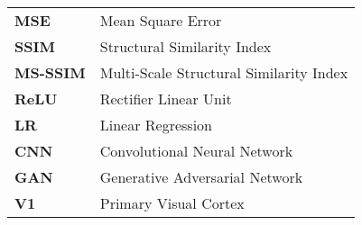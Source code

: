 \documentclass[12pt,a4paper]{report}
\let\openright=\clearpage
\begin{document}



\tableofcontents


%








\listoffigures



\begin{tabular}{ll}

\textbf{MSE} & Mean Square Error \\

\textbf{SSIM} & Structural Similarity Index \\

\textbf{MS-SSIM} & Multi-Scale Structural Similarity Index \\

\textbf{ReLU} & Rectifier Linear Unit \\

\textbf{LR} & Linear Regression \\

\textbf{CNN} & Convolutional Neural Network \\

\textbf{GAN} & Generative Adversarial Network \\

\textbf{V1} & Primary Visual Cortex \\


\end{tabular}


\appendix

%



\openright
\end{document}
